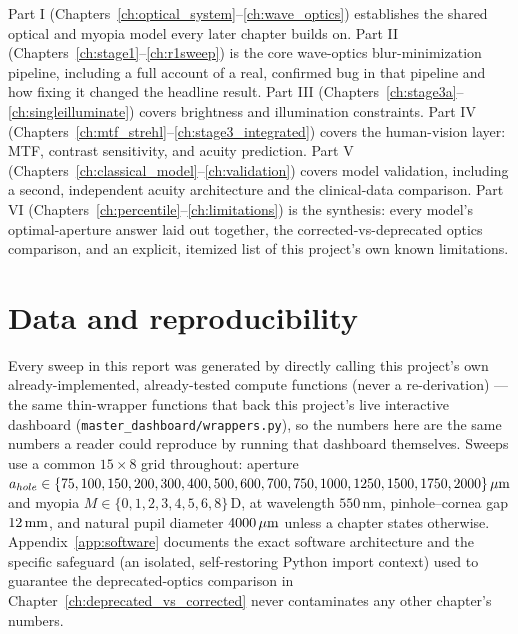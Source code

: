 Part I (Chapters~\ref{ch:optical_system}--\ref{ch:wave_optics}) establishes the shared
optical and myopia model every later chapter builds on. Part II
(Chapters~\ref{ch:stage1}--\ref{ch:r1sweep}) is the core wave-optics blur-minimization
pipeline, including a full account of a real, confirmed bug in that pipeline and how
fixing it changed the headline result. Part III
(Chapters~\ref{ch:stage3a}--\ref{ch:singleilluminate}) covers brightness and
illumination constraints. Part IV (Chapters~\ref{ch:mtf_strehl}--\ref{ch:stage3_integrated})
covers the human-vision layer: MTF, contrast sensitivity, and acuity prediction. Part V
(Chapters~\ref{ch:classical_model}--\ref{ch:validation}) covers model validation,
including a second, independent acuity architecture and the clinical-data comparison.
Part VI (Chapters~\ref{ch:percentile}--\ref{ch:limitations}) is the synthesis: every
model's optimal-aperture answer laid out together, the corrected-vs-deprecated optics
comparison, and an explicit, itemized list of this project's own known limitations.

\section{Data and reproducibility}

Every sweep in this report was generated by directly calling this project's own
already-implemented, already-tested compute functions (never a re-derivation) --- the
same thin-wrapper functions that back this project's live interactive dashboard
(\texttt{master\_dashboard/wrappers.py}), so the numbers here are the same numbers a
reader could reproduce by running that dashboard themselves. Sweeps use a common
$15\times 8$ grid throughout: aperture $a_{hole}\in\{75,100,150,200,300,400,500,600,
700,750,1000,1250,1500,1750,2000\}\,\mu\text{m}$ and myopia $M\in\{0,1,2,3,4,5,6,8\}\,$D, at
wavelength $550\,$nm, pinhole--cornea gap $12\,\text{mm}$, and natural pupil diameter
$4000\,\mu\text{m}$ unless a chapter states otherwise. Appendix~\ref{app:software} documents the
exact software architecture and the specific safeguard (an isolated, self-restoring
Python import context) used to guarantee the deprecated-optics comparison in
Chapter~\ref{ch:deprecated_vs_corrected} never contaminates any other chapter's numbers.
